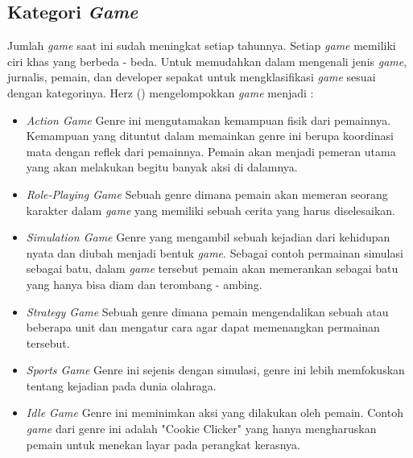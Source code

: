 	\subsection{Kategori \textit{Game}}
	Jumlah \textit{game} saat ini sudah meningkat setiap tahunnya. Setiap \textit{game} memiliki ciri khas yang berbeda - beda. Untuk memudahkan dalam mengenali jenis \textit{game}, jurnalis, pemain, dan developer sepakat untuk mengklasifikasi \textit{game} sesuai dengan kategorinya. Herz (\citeyear{article.herz}) mengelompokkan \textit{game} menjadi :
	\begin{itemize}
		\item \textit{Action Game}
			\subitem Genre ini mengutamakan kemampuan fisik dari pemainnya. Kemampuan yang dituntut dalam memainkan genre ini berupa koordinasi mata dengan reflek dari pemainnya. Pemain akan menjadi pemeran utama yang akan melakukan begitu banyak aksi di dalamnya.
		\item \textit{Role-Playing Game}
			\subitem Sebuah genre dimana pemain akan memeran seorang karakter dalam \textit{game} yang memiliki sebuah cerita yang harus diselesaikan.
		\item \textit{Simulation Game}
			\subitem Genre yang mengambil sebuah kejadian dari kehidupan nyata dan diubah menjadi bentuk \textit{game}. Sebagai contoh permainan simulasi sebagai batu, dalam \textit{game} tersebut pemain akan memerankan sebagai batu yang hanya bisa diam dan terombang - ambing.
		\item \textit{Strategy Game}
			\subitem Sebuah genre dimana pemain mengendalikan sebuah atau beberapa unit dan mengatur cara agar dapat memenangkan permainan tersebut.
		\item \textit{Sports Game}
			\subitem Genre ini sejenis dengan simulasi, genre ini lebih memfokuskan tentang kejadian pada dunia olahraga.
		\item \textit{Idle Game}
			\subitem Genre ini meminimkan aksi yang dilakukan oleh pemain. Contoh \textit{game} dari genre ini adalah "Cookie Clicker" yang hanya mengharuskan pemain untuk menekan layar pada perangkat kerasnya.
	\end{itemize}
	
